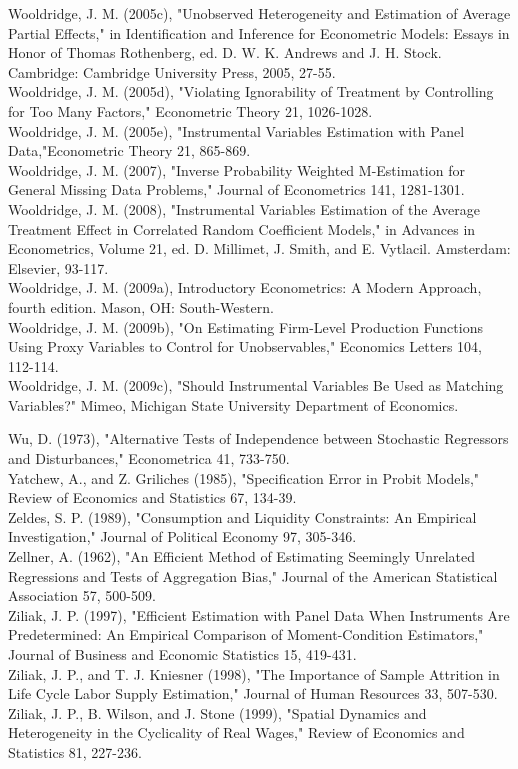 \documentclass[10pt]{article}
\begin{document}
Wooldridge, J. M. (2005c), "Unobserved Heterogeneity and Estimation of Average Partial Effects," in Identification and Inference for Econometric Models: Essays in Honor of Thomas Rothenberg, ed. D. W. K. Andrews and J. H. Stock. Cambridge: Cambridge University Press, 2005, 27-55.\\
Wooldridge, J. M. (2005d), "Violating Ignorability of Treatment by Controlling for Too Many Factors," Econometric Theory 21, 1026-1028.\\
Wooldridge, J. M. (2005e), "Instrumental Variables Estimation with Panel Data,"Econometric Theory 21, 865-869.\\
Wooldridge, J. M. (2007), "Inverse Probability Weighted M-Estimation for General Missing Data Problems," Journal of Econometrics 141, 1281-1301.\\
Wooldridge, J. M. (2008), "Instrumental Variables Estimation of the Average Treatment Effect in Correlated Random Coefficient Models," in Advances in Econometrics, Volume 21, ed. D. Millimet, J. Smith, and E. Vytlacil. Amsterdam: Elsevier, 93-117.\\
Wooldridge, J. M. (2009a), Introductory Econometrics: A Modern Approach, fourth edition. Mason, OH: South-Western.\\
Wooldridge, J. M. (2009b), "On Estimating Firm-Level Production Functions Using Proxy Variables to Control for Unobservables," Economics Letters 104, 112-114.\\
Wooldridge, J. M. (2009c), "Should Instrumental Variables Be Used as Matching Variables?" Mimeo, Michigan State University Department of Economics.

Wu, D. (1973), "Alternative Tests of Independence between Stochastic Regressors and Disturbances," Econometrica 41, 733-750.\\
Yatchew, A., and Z. Griliches (1985), "Specification Error in Probit Models," Review of Economics and Statistics 67, 134-39.\\
Zeldes, S. P. (1989), "Consumption and Liquidity Constraints: An Empirical Investigation," Journal of Political Economy 97, 305-346.\\
Zellner, A. (1962), "An Efficient Method of Estimating Seemingly Unrelated Regressions and Tests of Aggregation Bias," Journal of the American Statistical Association 57, 500-509.\\
Ziliak, J. P. (1997), "Efficient Estimation with Panel Data When Instruments Are Predetermined: An Empirical Comparison of Moment-Condition Estimators," Journal of Business and Economic Statistics 15, 419-431.\\
Ziliak, J. P., and T. J. Kniesner (1998), "The Importance of Sample Attrition in Life Cycle Labor Supply Estimation," Journal of Human Resources 33, 507-530.\\
Ziliak, J. P., B. Wilson, and J. Stone (1999), "Spatial Dynamics and Heterogeneity in the Cyclicality of Real Wages," Review of Economics and Statistics 81, 227-236.
\end{document}
